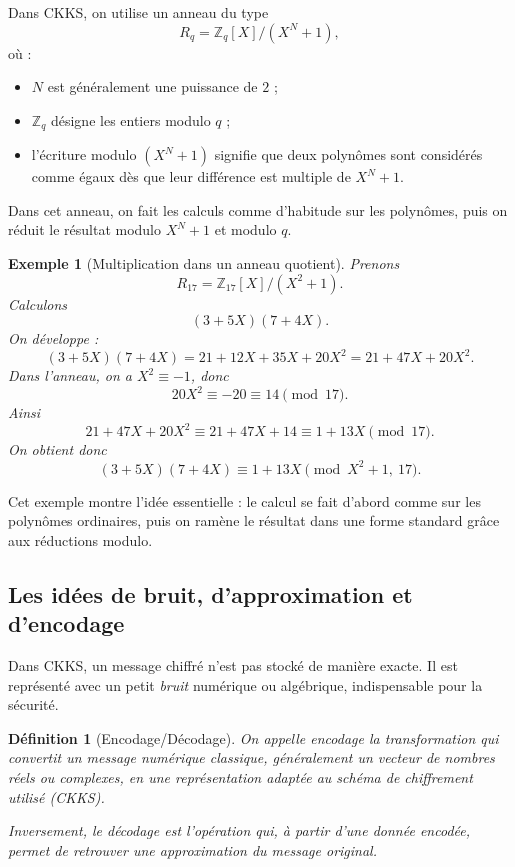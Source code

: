 \documentclass[11pt,a4paper]{article}
\newtheorem{definition}{Définition}[section]
\newtheorem{example}{Exemple}[section]
\begin{document}
Dans CKKS, on utilise un anneau du type
\[
R_q=\mathbb{Z}_q[X]/(X^N+1),
\]
où :
\begin{itemize}[leftmargin=2em]
  \item $N$ est généralement une puissance de $2$ ;
  \item $\mathbb{Z}_q$ désigne les entiers modulo $q$ ;
  \item l'écriture modulo $(X^N+1)$ signifie que deux polynômes sont considérés comme égaux dès que leur différence est multiple de $X^N+1$.
\end{itemize}

Dans cet anneau, on fait les calculs comme d'habitude sur les polynômes, puis on réduit le résultat modulo $X^N+1$ et modulo $q$.

\begin{example}[Multiplication dans un anneau quotient]
Prenons
\[
R_{17}=\mathbb{Z}_{17}[X]/(X^2+1).
\]
Calculons
\[
(3+5X)(7+4X).
\]
On développe :
\[
(3+5X)(7+4X)=21+12X+35X+20X^2=21+47X+20X^2.
\]
Dans l'anneau, on a $X^2\equiv -1$, donc
\[
20X^2\equiv -20 \equiv 14 \pmod{17}.
\]
Ainsi
\[
21+47X+20X^2 \equiv 21+47X+14 \equiv 1+13X \pmod{17}.
\]
On obtient donc
\[
(3+5X)(7+4X)\equiv 1+13X \pmod{X^2+1,\ 17}.
\]
\end{example}

Cet exemple montre l'idée essentielle : le calcul se fait d'abord comme sur les polynômes ordinaires, puis on ramène le résultat dans une forme standard grâce aux réductions modulo.

\subsection{Les idées de bruit, d'approximation et d'encodage}

Dans CKKS, un message chiffré n'est pas stocké de manière exacte. Il est représenté avec un petit \emph{bruit} numérique ou algébrique, indispensable pour la sécurité.

\begin{definition}[Encodage/Décodage]
On appelle \emph{encodage} la transformation qui convertit un message numérique classique, généralement un vecteur de nombres réels ou complexes, en une représentation adaptée au schéma de chiffrement utilisé (CKKS). 

Inversement, le \emph{décodage} est l'opération qui, à partir d'une donnée encodée, permet de retrouver une approximation du message original.
\end{definition}
\end{document}
